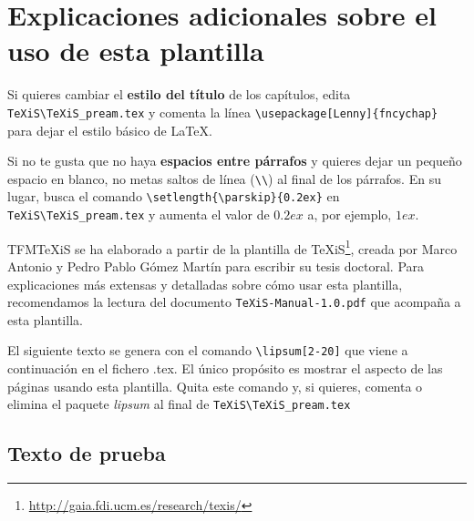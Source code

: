\section{Explicaciones adicionales sobre el uso de esta plantilla}
Si quieres cambiar el \textbf{estilo del título} de los capítulos, edita \verb|TeXiS\TeXiS_pream.tex| y comenta la línea \verb|\usepackage[Lenny]{fncychap}| para dejar el estilo básico de \LaTeX.

Si no te gusta que no haya \textbf{espacios entre párrafos} y quieres dejar un pequeño espacio en blanco, no metas saltos de línea (\verb|\\|) al final de los párrafos. En su lugar, busca el comando  \verb|\setlength{\parskip}{0.2ex}| en \verb|TeXiS\TeXiS_pream.tex| y aumenta el valor de $0.2ex$ a, por ejemplo, $1ex$.

TFMTeXiS se ha elaborado a partir de la plantilla de TeXiS\footnote{\url{http://gaia.fdi.ucm.es/research/texis/}}, creada por Marco Antonio y Pedro Pablo Gómez Martín para escribir su tesis doctoral. Para explicaciones más extensas y detalladas sobre cómo usar esta plantilla, recomendamos la lectura del documento \texttt{TeXiS-Manual-1.0.pdf} que acompaña a esta plantilla.

El siguiente texto se genera con el comando \verb|\lipsum[2-20]| que viene a continuación en el fichero .tex. El único propósito es mostrar el aspecto de las páginas usando esta plantilla. Quita este comando y, si quieres, comenta o elimina el paquete \textit{lipsum} al final de \verb|TeXiS\TeXiS_pream.tex|

\subsection{Texto de prueba}


\lipsum[2-20]